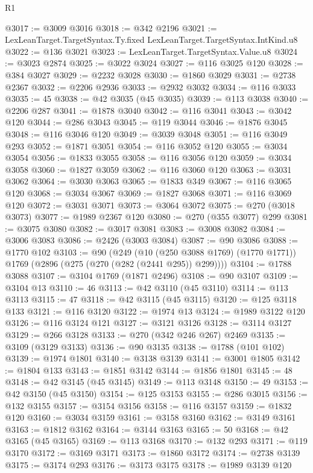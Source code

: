 \begin{lexlean}{R1}
\begin{coremodule}
@3017 := @3009 @3016
@3018 := @342 @2196
@3021 := LexLeanTarget.TargetSyntax.Ty.fixed LexLeanTarget.TargetSyntax.IntKind.u8
@3022 := @136 @3021
@3023 := LexLeanTarget.TargetSyntax.Value.u8
@3024 := @3023 @2874
@3025 := @3022 @3024
@3027 := @116 @3025 @120
@3028 := @384 @3027
@3029 := @2232 @3028
@3030 := @1860 @3029
@3031 := @2738 @2367
@3032 := @2206 @2936
@3033 := @2932 @3032
@3034 := @116 @3033
@3035 := 45
@3038 := @42 @3035 (@45 @3035)
@3039 := @113 @3038
@3040 := @2206 @287
@3041 := @1878 @3040
@3042 := @116 @3041
@3043 := @3042 @120
@3044 := @286 @3043
@3045 := @119 @3044
@3046 := @1876 @3045
@3048 := @116 @3046 @120
@3049 := @3039 @3048
@3051 := @116 @3049 @293
@3052 := @1871 @3051
@3054 := @116 @3052 @120
@3055 := @3034 @3054
@3056 := @1833 @3055
@3058 := @116 @3056 @120
@3059 := @3034 @3058
@3060 := @1827 @3059
@3062 := @116 @3060 @120
@3063 := @3031 @3062
@3064 := @3030 @3063
@3065 := @1833 @349
@3067 := @116 @3065 @120
@3068 := @3034 @3067
@3069 := @1827 @3068
@3071 := @116 @3069 @120
@3072 := @3031 @3071
@3073 := @3064 @3072
@3075 := @270 (@3018 @3073)
@3077 := @1989 @2367 @120
@3080 := @270 (@355 @3077) @299
@3081 := @3075 @3080
@3082 := @3017 @3081
@3083 := @3008 @3082
@3084 := @3006 @3083
@3086 := @2426 (@3003 @3084)
@3087 := @90 @3086
@3088 := @1770 @102
@3103 := @90
    (@249
      (@10 (@250 @3088 @1769) (@1770 @1771))
      @1769
      (@2896 (@275 (@270 (@282 (@2441 @295)) @299))))
@3104 := @1788 @3088
@3107 := @3104 @1769 (@1871 @2496)
@3108 := @90 @3107
@3109 := @3104 @13
@3110 := 46
@3113 := @42 @3110 (@45 @3110)
@3114 := @113 @3113
@3115 := 47
@3118 := @42 @3115 (@45 @3115)
@3120 := @125 @3118 @133
@3121 := @116 @3120
@3122 := @1974 @13
@3124 := @1989 @3122 @120
@3126 := @116 @3124 @121
@3127 := @3121 @3126
@3128 := @3114 @3127
@3129 := @266 @3128
@3133 := @270 (@342 @246 @267) @2469
@3135 := @3109 (@3129 @3133)
@3136 := @90 @3135
@3138 := @1788 (@101 @102)
@3139 := @1974 @1801
@3140 := @3138 @3139
@3141 := @3001 @1805
@3142 := @1804 @133
@3143 := @1851 @3142
@3144 := @1856 @1801
@3145 := 48
@3148 := @42 @3145 (@45 @3145)
@3149 := @113 @3148
@3150 := 49
@3153 := @42 @3150 (@45 @3150)
@3154 := @125 @3153
@3155 := @286 @3015
@3156 := @132 @3155
@3157 := @3154 @3156
@3158 := @116 @3157
@3159 := @1832 @120
@3160 := @3034 @3159
@3161 := @3158 @3160
@3162 := @3149 @3161
@3163 := @1812 @3162
@3164 := @3144 @3163
@3165 := 50
@3168 := @42 @3165 (@45 @3165)
@3169 := @113 @3168
@3170 := @132 @293
@3171 := @119 @3170
@3172 := @3169 @3171
@3173 := @1860 @3172
@3174 := @2738 @3139
@3175 := @3174 @293
@3176 := @3173 @3175
@3178 := @1989 @3139 @120

\end{coremodule}
\end{lexlean}
